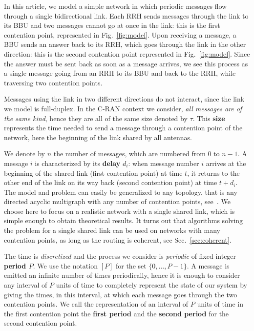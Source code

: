 \documentclass[a4paper,UKenglish,cleveref, autoref, thm-restate]{lipics-v2019}
\begin{document}
In this article, we model a simple network in which periodic messages flow through a single bidirectional link. Each RRH sends messages through the link to its
BBU and two messages cannot go at once in the link: this is the first contention point, represented in Fig.~\ref{fig:model}. Upon receiving a message, a BBU sends an answer back to its RRH, which goes through the link in the other direction: this is the second contention point represented in Fig.~\ref{fig:model}. Since the answer must be sent back as soon as a message arrives, we see this process as a single message going from an RRH to its BBU and back to the RRH, while traversing two contention points. 

Messages using the link in two different directions do not interact, since the link we model is full-duplex. In the C-RAN context we consider, \emph{all messages are of the same kind}, hence they are all of the same size denoted by $\tau$. This \textbf{size} represents the time needed to send a message through a contention point of the network, here the beginning of the link shared by all antennas.

 We denote by $n$ the number of messages, which are numbered from $0$ to $n-1$. A message $i$ is characterized by its \textbf{delay} $d_i$: when message number $i$ arrives at the beginning of the shared link (first contention point) at time $t$, it returns to the other end of the link on its way back (second contention point) at time $t + d_i$. The model and problem can easily be generalized to any topology, that is any directed acyclic multigraph with any number of contention points, see~\cite{bartharxiv2018deterministic}. We choose here to focus on a realistic network with a single shared link, which is simple enough to obtain theoretical results. It turns out that algorithms solving the problem for a single shared link can be used on networks with many contention points, as long as the routing is coherent, see Sec.~\ref{sec:coherent}. 

The time is \emph{discretized} and the process we consider is \emph{periodic} of fixed integer \textbf{period $P$}. We use the notation $[P]$ for the set $\{0,\dots,P-1\}$. A message is emitted an infinite number of times periodically, hence it is enough to consider any interval of $P$ units of time to completely represent the state of our system by giving the times, in this interval, at which each message goes through the two contention points. We call the representation of an interval of $P$ units of time in the first contention point the \textbf{first period} and the \textbf{second period} for the second contention point. 
\end{document}
